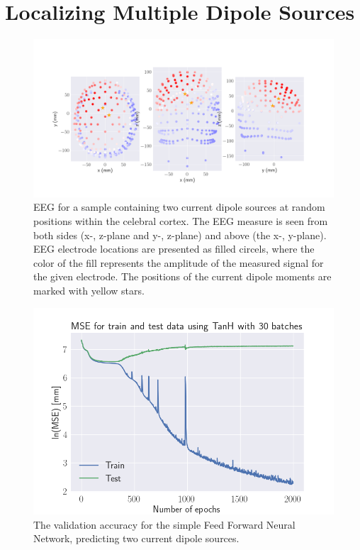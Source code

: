 \documentclass[a4paper, UKenglish, 11pt]{uiomaster}
\begin{document}
\section{Localizing Multiple Dipole Sources}
\begin{figure}[!htb]
    \centering
    \includegraphics[width=\linewidth]{../Code/plots/finals/eeg_field_2_2.png}
    \caption{EEG for a sample containing two current dipole sources at random positions within the celebral cortex. The EEG measure is seen from both sides (x-, z-plane and y-, z-plane) and above (the x-, y-plane). EEG electrode locations are presented as filled circels, where the color of the fill represents the amplitude of the measured signal for the given electrode. The positions of the current dipole moments are marked with yellow stars.}
    \label{fig:dipole_area_result}
\end{figure}

\begin{figure}[!htb]
    \centering
    \includegraphics[width=\linewidth]{../Code/plots/finals/MSE_NN_2_10000_l1_TanH_30_2000.png}
    \caption{The validation accuracy for the simple Feed Forward Neural Network, predicting two current dipole sources.}
    \label{fig:dipole_area_result}
\end{figure}
\end{document}
